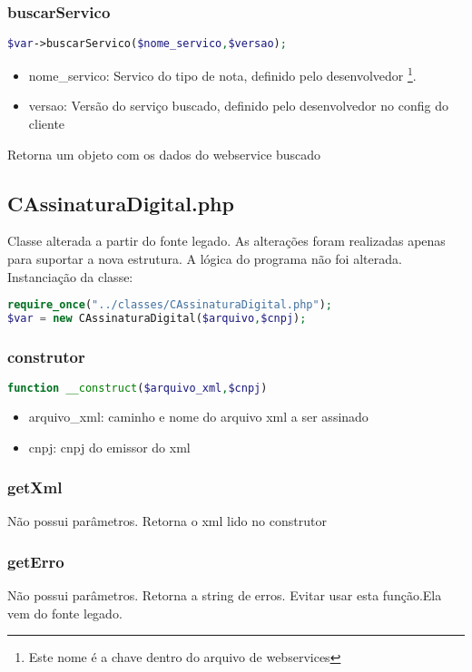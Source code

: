 \documentclass[a4paper]{article}
\newcommand{\dev}{desenvolvedor }
\begin{document}
\subsubsection{buscarServico}
\begin{lstlisting}[language=Php]
$var->buscarServico($nome_servico,$versao);
\end{lstlisting}
\begin{itemize}
	\item nome\_servico: Servico do tipo de nota, definido pelo \dev\footnote{Este nome é a chave dentro do arquivo de webservices}.
	\item versao: Versão do serviço buscado, definido pelo \dev no config do cliente
\end{itemize}
Retorna um objeto com os dados do webservice buscado


\subsection{CAssinaturaDigital.php}
Classe alterada a partir do fonte legado. As alterações foram realizadas apenas para suportar a nova estrutura.
A lógica do programa não foi alterada.
Instanciação da classe:
\begin{lstlisting}[language=Php]
require_once("../classes/CAssinaturaDigital.php");
$var = new CAssinaturaDigital($arquivo,$cnpj);
\end{lstlisting}
\subsubsection{construtor}
\begin{lstlisting}[language=Php]
function __construct($arquivo_xml,$cnpj)
\end{lstlisting}
\begin{itemize}
	\item arquivo\_xml: caminho e nome do arquivo xml a ser assinado
	\item cnpj: cnpj do emissor do xml
\end{itemize}
\subsubsection{getXml}
Não possui parâmetros.
Retorna o xml lido no construtor
\subsubsection{getErro}
Não possui parâmetros.
Retorna a string de erros.
Evitar usar esta função.Ela vem do fonte legado.
\end{document}
